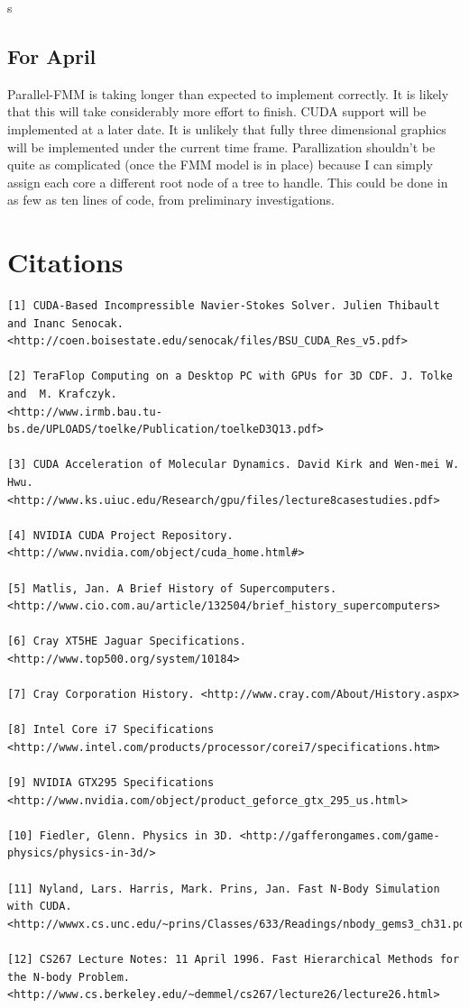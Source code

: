 s\documentclass[10pt]{article}
\begin{document}
\subsection{For April}
Parallel-FMM is taking longer than expected to implement correctly. It is likely that this will take considerably more effort to finish. CUDA support will be implemented at a later date. It is unlikely that fully three dimensional graphics will be implemented under the current time frame. Parallization shouldn't be quite as complicated (once the FMM model is in place) because I can simply assign each core a different root node of a tree to handle. This could be done in as few as ten lines of code, from preliminary investigations. 

\section{Citations}


\begin{verbatim}
[1] CUDA-Based Incompressible Navier-Stokes Solver. Julien Thibault and Inanc Senocak.
<http://coen.boisestate.edu/senocak/files/BSU_CUDA_Res_v5.pdf>

[2] TeraFlop Computing on a Desktop PC with GPUs for 3D CDF. J. Tolke and  M. Krafczyk.  
<http://www.irmb.bau.tu-bs.de/UPLOADS/toelke/Publication/toelkeD3Q13.pdf>

[3] CUDA Acceleration of Molecular Dynamics. David Kirk and Wen-mei W. Hwu.  
<http://www.ks.uiuc.edu/Research/gpu/files/lecture8casestudies.pdf>

[4] NVIDIA CUDA Project Repository. <http://www.nvidia.com/object/cuda_home.html#>

[5] Matlis, Jan. A Brief History of Supercomputers. 
<http://www.cio.com.au/article/132504/brief_history_supercomputers>

[6] Cray XT5HE Jaguar Specifications. <http://www.top500.org/system/10184>

[7] Cray Corporation History. <http://www.cray.com/About/History.aspx>

[8] Intel Core i7 Specifications <http://www.intel.com/products/processor/corei7/specifications.htm>

[9] NVIDIA GTX295 Specifications <http://www.nvidia.com/object/product_geforce_gtx_295_us.html>

[10] Fiedler, Glenn. Physics in 3D. <http://gafferongames.com/game-physics/physics-in-3d/>

[11] Nyland, Lars. Harris, Mark. Prins, Jan. Fast N-Body Simulation with CUDA. 
<http://wwwx.cs.unc.edu/~prins/Classes/633/Readings/nbody_gems3_ch31.pdf>

[12] CS267 Lecture Notes: 11 April 1996. Fast Hierarchical Methods for the N-body Problem.
<http://www.cs.berkeley.edu/~demmel/cs267/lecture26/lecture26.html>
\end{verbatim}
\end{document}
